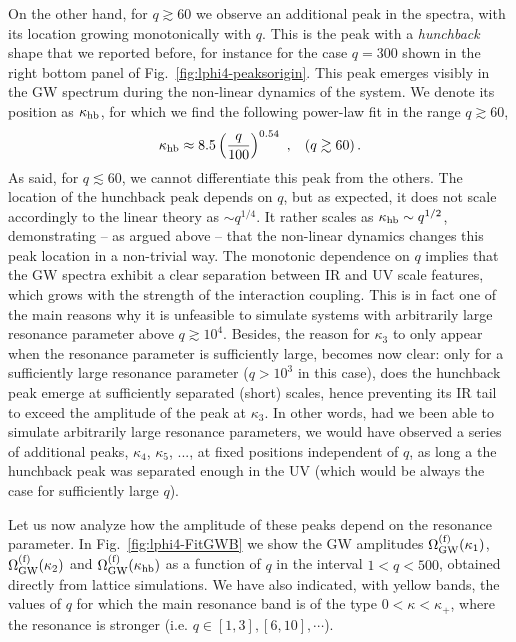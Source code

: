 \documentclass[a4paper,11pt]{article}
\newcommand{\be}{\begin{equation}}
\newcommand{\ee}{\end{equation}}
\begin{document}
On the other hand, for $q \gtrsim 60$ we observe an additional peak in the spectra, with its location growing monotonically with $q$. This is the peak with a \textit{hunchback} shape that we reported before, for instance for the case $q = 300$ shown in the right bottom panel of Fig.~\ref{fig:lphi4-peaksorigin}. This peak emerges visibly in the GW spectrum during the non-linear dynamics of the system. We denote its position as $\kappa_{\rm hb}$, for which we find the following power-law fit in the range $q \gtrsim 60$,
\be \kappa_{\rm hb} \approx 8.5 \left( \frac{q}{100} \right)^{0.54} \ , \hspace{0.3cm} (q \gtrsim 60) \, . \label{eq:lphi4-fitspectra4} \ee
As said, for $q \lesssim 60$, we cannot differentiate this peak from the others. The location of the hunchback peak depends on $q$, but as expected, it does not scale accordingly to the linear theory as $\sim q^{1/4}$. It rather scales as $\kappa_{\rm hb} \sim q^{1/2}$, demonstrating -- as argued above -- that the non-linear dynamics changes this peak location in a non-trivial way. The monotonic dependence on $q$ implies that the GW spectra exhibit a clear separation between IR and UV scale features, which grows with the strength of the interaction coupling. This is in fact one of the main reasons why it is unfeasible to simulate systems with arbitrarily large resonance parameter above $q \gtrsim 10^4$. Besides, the reason for $\kappa_3$ to only appear when the resonance parameter is sufficiently large, becomes now clear: only for a sufficiently large resonance parameter ($q > 10^3$ in this case), does the hunchback peak emerge at sufficiently separated (short) scales, hence preventing its IR tail to exceed the amplitude of the peak at $\kappa_3$. In other words, had we been able to simulate arbitrarily large resonance parameters, we would have observed a series of additional peaks, $\kappa_4$, $\kappa_5$, ..., at fixed positions independent of $q$, as long a the hunchback peak was separated enough in the UV (which would be always the case for sufficiently large $q$).

Let us now analyze how the amplitude of these peaks depend on the resonance parameter. In Fig.~\ref{fig:lphi4-FitGWB} we show the GW amplitudes $\Omega_{\rm GW}^{\rm (f)} (\kappa_1)$,  $\Omega_{\rm GW}^{\rm (f)} (\kappa_2)$ and  $\Omega_{\rm GW}^{\rm (f)} (\kappa_{\rm hb})$ as a function of $q$ in the interval $1 < q < 500$, obtained directly from lattice simulations. We have also indicated, with yellow bands, the values of $q$ for which the main resonance band is of the type $0 < \kappa < \kappa_+$, where the resonance is stronger (i.e. $q \in [1,3], [6,10], \cdots $). 
\end{document}
